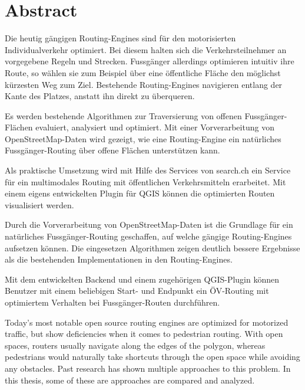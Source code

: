 
\chapter*{Abstract}

Die heutig gängigen Routing-Engines sind für den motorisierten Individualverkehr optimiert. Bei diesem halten sich die Verkehrsteilnehmer an vorgegebene Regeln und Strecken. Fussgänger allerdings optimieren intuitiv ihre Route, so wählen sie zum Beispiel über eine öffentliche Fläche den möglichst kürzesten Weg zum Ziel. Bestehende Routing-Engines navigieren entlang der Kante des Platzes, anstatt ihn direkt zu überqueren.

Es werden bestehende Algorithmen zur Traversierung von offenen Fussgänger-Flächen evaluiert, analysiert und optimiert. Mit einer Vorverarbeitung von OpenStreetMap-Daten wird gezeigt, wie eine Routing-Engine ein natürliches Fussgänger-Routing über offene Flächen unterstützen kann.

Als praktische Umsetzung wird mit Hilfe des Services von search.ch ein Service für ein multimodales Routing mit öffentlichen Verkehrsmitteln erarbeitet. Mit einem eigens entwickelten Plugin für QGIS können die optimierten Routen visualisiert werden.

Durch die Vorverarbeitung von OpenStreetMap-Daten ist die Grundlage für ein natürliches Fussgänger-Routing geschaffen, auf welche gängige Routing-Engines aufsetzen können. Die eingesetzen Algorithmen zeigen deutlich bessere Ergebnisse als die bestehenden Implementationen in den Routing-Engines.

Mit dem entwickelten Backend und einem zugehörigen QGIS-Plugin können Benutzer mit einem beliebigen Start- und Endpunkt ein ÖV-Routing mit optimiertem Verhalten bei Fussgänger-Routen durchführen.

\cleardoublepage

Today's most notable open source routing engines are optimized for motorized traffic, but show deficiencies when it comes to pedestrian routing. With open spaces, routers usually navigate along the edges of the polygon, whereas pedestrians would naturally take shortcuts through the open space while avoiding any obstacles.
Past research has shown multiple approaches to this problem. In this thesis, some of these are approaches are compared and analyzed.

